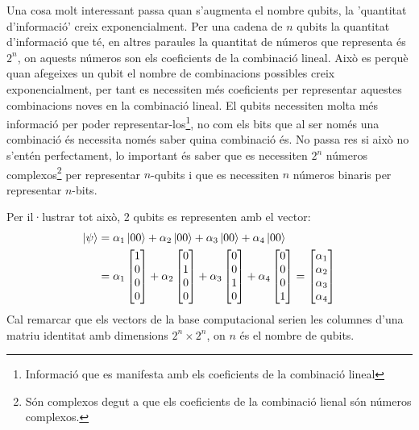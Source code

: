 Una cosa molt interessant passa quan s'augmenta el nombre qubits, la 'quantitat d'informació' creix exponencialment. Per una cadena de $n$ qubits la quantitat d'informació que té, en altres paraules la quantitat de números que representa és $2^n$, on aquests números son els coeficients de la combinació lineal. Això es perquè quan afegeixes un qubit el nombre de combinacions possibles creix exponencialment, per tant es necessiten més coeficients per representar aquestes combinacions noves en la combinació lineal. El qubits necessiten molta més informació per poder representar-los\footnote{Informació que es manifesta amb els coeficients de la combinació lineal}, no com els bits que al ser només una combinació és necessita només saber quina combinació és. No passa res si això no s'entén perfectament, lo important és saber que es necessiten $2^n$ números complexos\footnote{Són complexos degut a que els coeficients de la combinació lienal són números complexos.} per representar $n$-qubits i que es necessiten $n$ números binaris per representar $n$-bits.

Per il·lustrar tot això, 2 qubits es representen amb el vector:
\begin{align*}
	\ket{\psi} &= \alpha_1\ket{00} + \alpha_2\ket{00} + \alpha_3\ket{00} + \alpha_4\ket{00}\\
			&= \alpha_1\begin{bmatrix} 1 \\ 0 \\ 0 \\ 0 \end{bmatrix} + \alpha_2 \begin{bmatrix} 0 \\ 1 \\ 0 \\ 0 \end{bmatrix} + \alpha_3 \begin{bmatrix} 0 \\ 0 \\ 1 \\ 0 \end{bmatrix} + \alpha_4\begin{bmatrix} 0 \\ 0 \\ 0 \\ 1 \end{bmatrix} 
			= \begin{bmatrix} \alpha_1 \\ \alpha_2 \\ \alpha_3 \\ \alpha_4 \end{bmatrix}
\end{align*}
Cal remarcar que els vectors de la base computacional serien les columnes d'una matriu identitat amb dimensions $2^n\times 2^n$, on $n$ és el nombre de qubits. 

